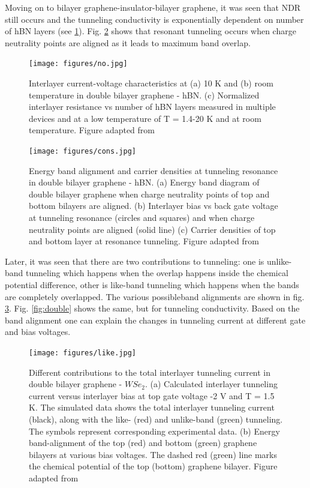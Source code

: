 Moving on to bilayer graphene-insulator-bilayer graphene, it was seen that NDR still occurs and the tunneling conductivity is exponentially dependent on number of hBN layers (see \ref{fig:no}). Fig. \ref{fig:cons} shows that resonant tunneling occurs when charge neutrality points are aligned as it leads to maximum band overlap.

\begin{figure}[H]
	\centering
	\texttt{[image: figures/no.jpg]}
	\caption{Interlayer current-voltage characteristics at (a) 10 K and (b) room temperature in double bilayer graphene - hBN. (c) Normalized	interlayer resistance vs number of hBN layers measured in multiple devices and at a low temperature of T = 1.4-20 K and at room temperature. Figure adapted from \cite{Tutuc}}
	\label{fig:no}
\end{figure}

\begin{figure}[H]
	\centering
	\texttt{[image: figures/cons.jpg]}
	\caption{Energy band alignment and carrier densities at tunneling resonance in double bilayer graphene - hBN. (a) Energy band diagram of double bilayer graphene when charge neutrality points of top and bottom bilayers are aligned. (b) Interlayer bias vs back gate voltage at tunneling resonance (circles and squares) and when charge neutrality points are aligned (solid line) (c) Carrier densities of top and bottom layer at resonance tunneling. Figure adapted from \cite{Tutuc}}
	\label{fig:cons}
\end{figure}

Later, it was seen that there are two contributions to tunneling: one is unlike-band tunneling which happens when the overlap happens inside the chemical potential difference, other is like-band tunneling which happens when the bands are completely overlapped. The various possibleband alignments are shown in fig. \ref{fig:like}. Fig. \ref{fig:double} shows the same, but for tunneling conductivity. Based on the band alignment one can explain the changes in tunneling current at different gate and bias voltages.

\begin{figure}[H]
	\centering
	\texttt{[image: figures/like.jpg]}
	\caption{Different contributions to the total interlayer tunneling current in double bilayer graphene - $WSe_2$. (a) Calculated interlayer tunneling current versus interlayer bias at top gate voltage -2 V and T = 1.5 K. The simulated data shows the total interlayer tunneling current (black), along with the like- (red) and unlike-band (green) tunneling. The symbols represent corresponding experimental data. (b) Energy band-alignment of the top (red) and bottom (green) graphene bilayers at various bias voltages. The dashed red (green) line marks the chemical potential of the top (bottom) graphene bilayer. Figure adapted from \cite{Tutuc17}}
	\label{fig:like}
\end{figure}

